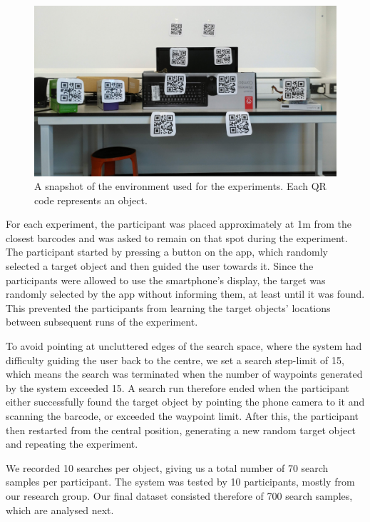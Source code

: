 \documentclass[a4paper, twoside]{article}
\begin{document}
\begin{figure}
  \centering
  \includegraphics[width=\columnwidth]{../figures/test_env_picture.jpg}
  \caption{A snapshot of the environment used for the experiments. Each QR code represents an object.}\label{fig:env-picture}
\end{figure}

For each experiment, the participant was placed approximately at 1m from the closest barcodes and was asked to remain on that spot during the experiment. The participant started by pressing a button on the app, which randomly selected a target object and then guided the user towards it. Since the participants were allowed to use the smartphone's display, the target was randomly selected by the app without informing them, at least until it was found. This prevented the participants from learning the target objects' locations between subsequent runs of the experiment.

To avoid pointing at uncluttered edges of the search space, where the system had difficulty guiding the user back to the centre, we set a search step-limit of 15, which means the search was terminated when the number of waypoints generated by the system exceeded 15. A search run therefore ended when the participant either successfully found the target object by pointing the phone camera to it and scanning the barcode, or exceeded the waypoint limit. After this, the participant then restarted from the central position, generating a new random target object and repeating the experiment.

We recorded 10 searches per object, giving us a total number of 70 search samples per participant. The system was tested by 10 participants, mostly from our research group. Our final dataset consisted therefore of 700 search samples, which are analysed next.
\end{document}
